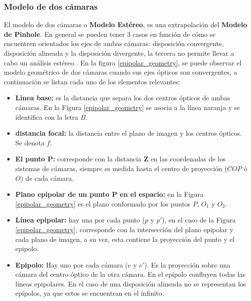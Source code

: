 \subsubsection{Modelo de dos cámaras}
El modelo de dos cámaras o \textbf{Modelo Estéreo}, es una extrapolación del \textbf{Modelo de Pinhole}. En general se pueden tener 3 casos en función de cómo se encuentren orientados los ejes de ambas cámaras: disposición convergente, disposición alineada y la disposición divergente, la tercera no permite llevar a cabo un análisis estéreo \cite{RSSFernando_homogeneusC}. En la figura \ref{epipolar_geometry}, se puede observar el modelo geométrico de dos cámaras cuando sus ejes ópticos son convergentes, a continuación se listan cada uno de los elementos relevantes:
\begin{itemize}
\item \textbf{Linea base:} es la distancia que separa los dos centros ópticos de ambas cámaras. En la Figura \ref{epipolar_geometry} se asocia a la línea naranja y se identifica con la letra $B$.
\item \textbf{distancia focal:} la distancia entre el plano de imagen y los centros ópticos. Se denota $f$.
\item\textbf{El punto P:} corresponde con la distancia \textbf{Z} en las coordenadas de los sistemas de cámaras, siempre es medida hasta el centro de proyección ($COP$ ó $O$) de cada cámara. 
\item \textbf{Plano epipolar de un punto P en el espacio:} en la Figura \ref{epipolar_geometry} es el plano conformado por los puntos $P$, $O_{1}$ y $O_{2}$.
\item\textbf{Línea epipolar:} hay una por cada punto ($p$ y $p'$), en el caso de la Figura \ref{epipolar_geometry}, corresponde con la intersección del plano epipolar y cada plano de imagen, a su vez, esta contiene la proyección del punto y el epipolo.
\item\textbf{Epipolo:} Hay uno por cada cámara ($e$ y $e'$). Es la proyección sobre una cámara del centro óptico de la otra cámara. En el epipolo confluyen todas las líneas epipolares. En el caso de una disposición alineada no se representan los epipolos, ya que estos se encuentran en el infinito.
\end{itemize}
